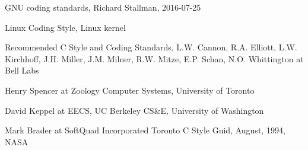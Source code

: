 \begin{thebibliography}{9}

\bibitem{}
    GNU coding standards,
    Richard Stallman,
    2016-07-25

\bibitem{}
    Linux Coding Style,
    Linux kernel

\bibitem{}
    Recommended C Style and Coding Standards,
    L.W. Cannon, R.A. Elliott, L.W. Kirchhoff, J.H. Miller, J.M. Milner,
    R.W. Mitze, E.P. Schan, N.O. Whittington at Bell Labs

    Henry Spencer at Zoology Computer Systems, University of Toronto

    David Keppel at EECS, UC Berkeley CS\&E, University of Washington

    Mark Brader at  SoftQuad Incorporated Toronto
\bibitem{}
    C Style Guid,
    August, 1994, NASA

\end{thebibliography}
